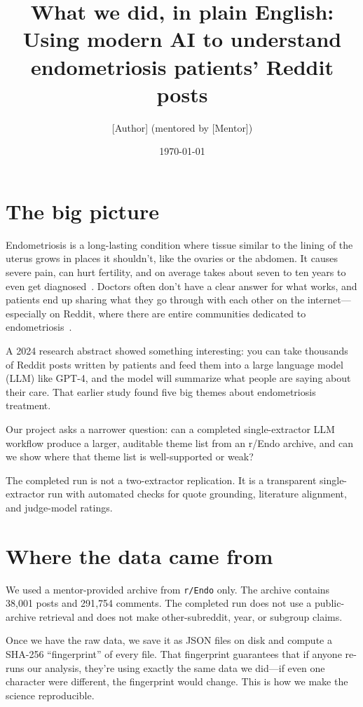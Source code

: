 \documentclass[11pt]{article}
\title{What we did, in plain English: \\
\large Using modern AI to understand endometriosis patients' Reddit posts}
\author{[Author] (mentored by [Mentor])}
\date{\today}
\begin{document}
\maketitle

\section{The big picture}

Endometriosis is a long-lasting condition where tissue similar to the
lining of the uterus grows in places it shouldn't, like the ovaries or
the abdomen. It causes severe pain, can hurt fertility, and on average
takes about seven to ten years to even get diagnosed~\cite{young2015}.
Doctors often don't have a clear answer for what works, and patients
end up sharing what they go through with each other on the
internet---especially on Reddit, where there are entire communities
dedicated to endometriosis~\cite{eysenbach2009infodemiology}.

A 2024 research abstract showed something interesting: you can take
thousands of Reddit posts written by patients and feed them into a
large language model (LLM) like GPT-4, and the model will summarize
what people are saying about their care. That earlier study found five
big themes about endometriosis treatment.

Our project asks a narrower question: can a completed
single-extractor LLM workflow produce a larger, auditable theme list
from an r/Endo archive, and can we show where that theme list is
well-supported or weak?

The completed run is not a two-extractor replication. It is a
transparent single-extractor run with automated checks for quote
grounding, literature alignment, and judge-model ratings.

\section{Where the data came from}

We used a mentor-provided archive from \texttt{r/Endo} only. The archive
contains 38{,}001 posts and 291{,}754 comments. The completed run does
not use a public-archive retrieval and does not make other-subreddit,
year, or subgroup claims.

Once we have the raw data, we save it as JSON files on disk and
compute a SHA-256 ``fingerprint'' of every file. That fingerprint
guarantees that if anyone re-runs our analysis, they're using exactly
the same data we did---if even one character were different, the
fingerprint would change. This is how we make the science
reproducible.
\end{document}
